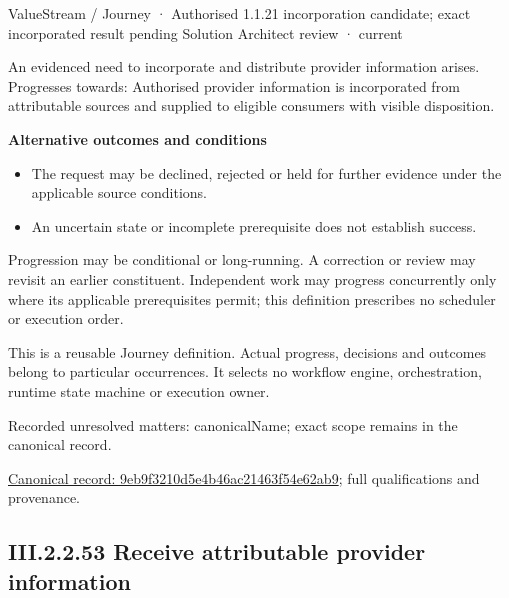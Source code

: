 \label{element:9eb9f3210d5e4b46ac21463f54e62ab9}
{\small ValueStream / Journey · Authorised 1.1.21 incorporation candidate; exact incorporated result pending Solution Architect review · current}\par

An evidenced need to incorporate and distribute provider information arises. Progresses towards: Authorised provider information is incorporated from attributable sources and supplied to eligible consumers with visible disposition.



\par\medskip\textbf{Alternative outcomes and conditions}\par


\begin{itemize}


\item The request may be declined, rejected or held for further evidence under the applicable source conditions.

\item An uncertain state or incomplete prerequisite does not establish success.

\end{itemize}


Progression may be conditional or long-running. A correction or review may revisit an earlier constituent. Independent work may progress concurrently only where its applicable prerequisites permit; this definition prescribes no scheduler or execution order.



This is a reusable Journey definition. Actual progress, decisions and outcomes belong to particular occurrences. It selects no workflow engine, orchestration, runtime state machine or execution owner.


{\small Recorded unresolved matters: canonicalName; exact scope remains in the canonical record.}\par
{\footnotesize \href{../../../../../../../continuum/strategy/value-stream/9eb9f3210d5e4b46ac21463f54e62ab9.md}{Canonical record: 9eb9f3210d5e4b46ac21463f54e62ab9}; full qualifications and provenance.}\par
\subsection*{III.2.2.53 Receive attributable provider information}
\label{navigation:III.2.2.53}

